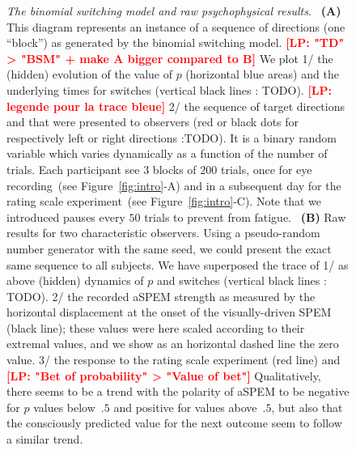 \documentclass[12pt,english]{article}%
\newcommand{\seeFig}[1]{Figure~\ref{fig:#1}}
\newcommand{\LP}[1]{\textbf{\textcolor{red}{[LP: #1]}}}
\begin{document}
\begin{figure}%
\caption{
\emph{The binomial switching model and raw psychophysical results.}%
~\textbf{(A)}
This diagram represents an instance of a sequence of directions (one ``block'')
as generated by the binomial switching model. %
\LP{"TD" > "BSM" + make A bigger compared to B}
We plot
1/ the (hidden) evolution of the value of $p$ (horizontal blue areas)
and the underlying times for switches (vertical black lines : TODO).
\LP{legende pour la trace bleue}
2/ the sequence of target directions
and that were presented to observers
(red or black dots for respectively left or right directions :TODO).
It is a binary random variable which varies dynamically
as a function of the number of trials.
Each participant see 3 blocks of $200$ trials,
once for eye recording~(see \seeFig{intro}-A)
and in a subsequent day for the rating scale experiment~(see \seeFig{intro}-C).
Note that we introduced pauses every $50$ trials to prevent from fatigue.
~\textbf{(B)} Raw results for two characteristic observers.
Using a pseudo-random number generator with the same seed,
we could present the exact same sequence to all subjects. %
We have superposed the trace of
1/ as above (hidden) dynamics of $p$ and switches (vertical black lines : TODO).
2/ the recorded aSPEM strength as measured by the horizontal displacement
at the onset of the visually-driven SPEM (black line);
these values were here scaled according to their extremal values,
and we show as an horizontal dashed line the zero value.
3/ the response to the rating scale experiment (red line) and
\LP{"Bet of probability" > "Value of bet"}
Qualitatively, there seems to be a trend with the polarity of aSPEM
to be negative for $p$ values below~$.5$ and positive for values above~$.5$,
but also that the consciously predicted value
for the next outcome
seem to follow a similar trend.
}
\label{fig:results_raw}
\end{figure}
\end{document}
